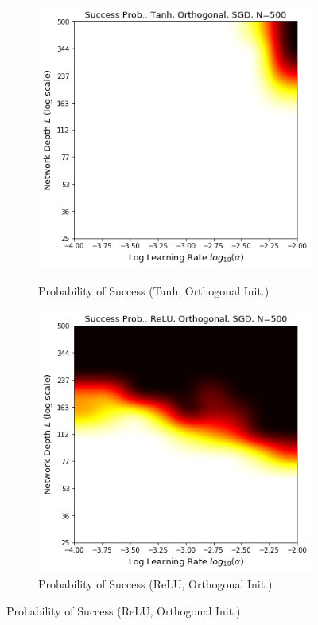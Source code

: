 \begin{figure}
\begin{subfigure}{8mm}
\end{subfigure}%
\\
\begin{subfigure}{\myWidth}
  \centering
  \caption{Probability of Success (Tanh, Orthogonal Init.)}
  \includegraphics[width=1.0\linewidth,trim={0 0 0 0.65cm},clip]{"s_tanh_orthogonal_sgd"}
  \label{fig:mnist_sim_s3}
\end{subfigure}\myspace
\begin{subfigure}{\myWidth}
  \centering
  \caption{Probability of Success (ReLU, Orthogonal Init.)}
  \includegraphics[width=1.0\linewidth,trim={0 0 0 0.65cm},clip]{"s_relu_orthogonal_sgd"}

\end{subfigure}
\end{figure}
